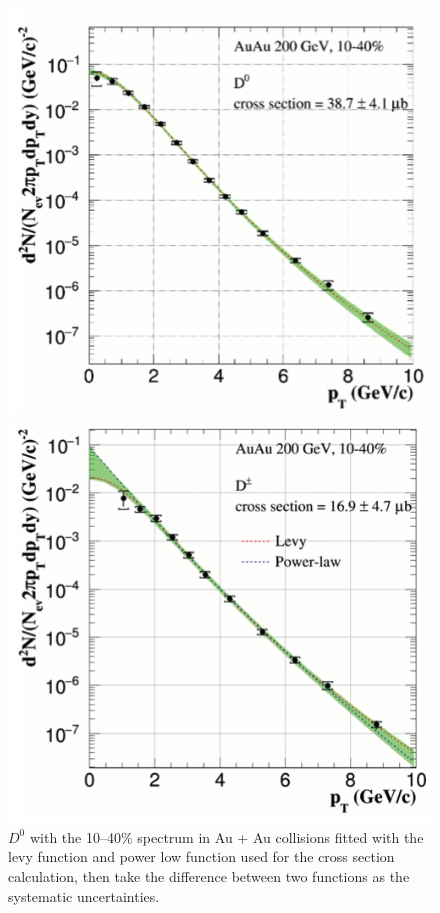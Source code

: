 \begin{figure}[htbp]
\begin{minipage}[htbp]{0.47\linewidth}
\centering
\includegraphics[width=1.0\textwidth,angle=0]{figure/Run14_D0HFT/ccx_1.png}
\caption{$D^{0}$ with the 10--40\% spectrum in Au + Au collisions fitted with the levy function and power low function used for the cross section calculation, then take the difference between two functions as the systematic uncertainties. \label{ccx_1}}
\end{minipage}
\hfill
\begin{minipage}[htbp]{0.47\linewidth}
\centering
\includegraphics[width=1.0\textwidth,angle=0]{figure/Run14_D0HFT/ccx_2.png}

\end{minipage}
\end{figure}
